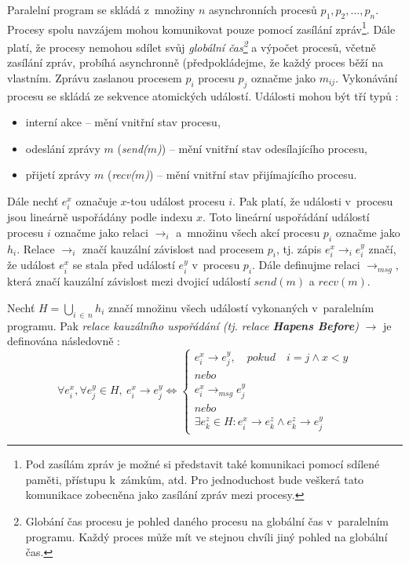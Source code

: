 
Paralelní program se skládá z~množiny $n$ asynchronních procesů ${p_1, p_2, ..., p_n}$. Procesy spolu navzájem mohou komunikovat pouze pomocí zasílání zpráv\footnote{Pod zasílám zpráv je možné si představit také komunikaci pomocí sdílené paměti, přístupu k~zámkům, atd. Pro jednoduchost bude veškerá tato komunikace zobecněna jako zasílání zpráv mezi procesy.}. Dále platí, že procesy nemohou sdílet svůj \textit{globální čas\footnote{Globání čas procesu je pohled daného procesu na globální čas v~paralelním programu. Každý proces může mít ve stejnou chvíli jiný pohled na globální čas.}} a výpočet procesů, včetně zasílání zpráv, probíhá asynchronně (předpokládejme, že každý proces běží na vlastním. Zprávu zaslanou procesem $p_i$ procesu $p_j$ označme jako $m_{ij}$. Vykonávání procesu se skládá ze sekvence atomických událostí. Události mohou být tří typů \cite{cite:PDI}:

\begin{itemize}
\item interní akce -- mění vnitřní stav procesu,
\item odeslání zprávy $m$ (\textit{send($m$)}) -- mění vnitřní stav odesílajícího procesu,
\item přijetí zprávy $m$ (\textit{recv($m$)}) -- mění vnitřní stav přijímajícího procesu.
\end{itemize}

Dále nechť $e^x_i$ označuje $x$-tou událost procesu $i$. Pak platí, že události v~procesu jsou lineárně uspořádány podle indexu $x$. Toto lineární uspořádání událostí procesu $i$ označme jako relaci $\rightarrow_i$ a~množinu všech akcí procesu $p_i$ označme jako $h_i$. Relace $\rightarrow_i$ značí kauzální závislost nad procesem $p_i$, tj. zápis $e^x_i \rightarrow_i e^y_i$ značí, že událost $e^x_i$ se stala před událostí $e^y_i$ v~procesu $p_i$. Dále definujme relaci $\rightarrow_{msg}$, která značí kauzální závislost mezi dvojicí událostí $send(m)$ a $recv(m)$.

Nechť $H=\bigcup\limits_{i \, \in\, n} h_i$ značí množinu všech událostí vykonaných v~paralelním programu. Pak \textit{relace kauzálního uspořádání (tj. relace \textbf{Hapens Before})} $\rightarrow$ je definována následovně \cite{cite:PDI}:
$$\forall e_i^x, \forall e_j^y \in H,\: e_i^x \rightarrow e_j^y \Leftrightarrow 
\left\{
	\begin{array}{ll}
       e_i^x \rightarrow e_j^y,\quad pokud \quad i=j \wedge x < y \\
       nebo\\
       e_i^x \rightarrow_{msg} e_j^y \\
       nebo\\
       \exists e_k^z \in H:  e_i^x \rightarrow e_k^z \wedge  e_k^z \rightarrow e_j^y
    \end{array}
\right.$$


